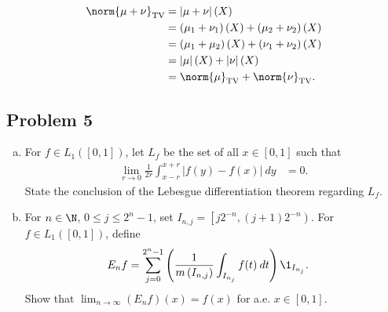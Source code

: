 \documentclass[10pt]{mypackage}
\begin{document}
\begin{enumerate}[(a)]
\begin{align*}
      \norm{\mu+\nu}_{\text{TV}} &= \left\vert \mu + \nu \right\vert(X)\\
                                                      &= \left( \mu_1 + \nu_1 \right)(X) + \left( \mu_2 + \nu_2 \right)(X)\\
                                          &= \left( \mu_1 + \mu_2 \right)(X) + \left( \nu_1 + \nu_2 \right)(X)\\
                                          &= \left\vert \mu \right\vert(X) + \left\vert \nu \right\vert(X)\\
                                          &= \norm{\mu}_{\text{TV}} + \norm{\nu}_{\text{TV}}.
    \end{align*}
    
\end{enumerate}
\subsection{Problem 5}%
\begin{problem}\hfill
  \begin{enumerate}[(a)]
    \item For $f\in L_1\left( [0,1] \right)$, let $L_f$ be the set of all $x\in [0,1]$ such that
      \begin{align*}
        \lim_{r\rightarrow 0} \frac{1}{2r} \int_{x-r}^{x+r} \left\vert f(y)-f(x) \right\vert\:dy &= 0.
      \end{align*}
      State the conclusion of the Lebesgue differentiation theorem regarding $L_f$.
    \item For $n\in \N$, $0 \leq j \leq 2^{n}-1$, set $I_{n,j} = \left[ j2^{-n},\left( j+1 \right)2^{-n} \right)$. For $f\in L_1\left( [0,1] \right)$, define
      \begin{align*}
        E_{n}f &= \sum_{j=0}^{2^{n}-1} \left( \frac{1}{m\left( I_{n,j} \right)} \int_{I_{n_j}}^{} f(t)\:dt \right)\1_{I_{n_j}}.
      \end{align*}
      Show that $\lim_{n\rightarrow\infty} \left( E_nf \right)(x) = f(x)$ for a.e. $x\in [0,1]$.
  \end{enumerate}
\end{problem}
\end{document}
